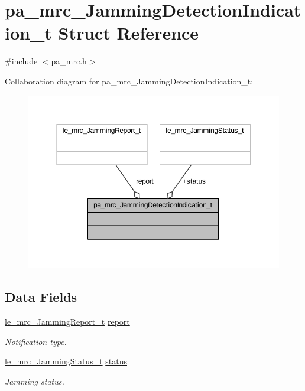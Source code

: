 \hypertarget{structpa__mrc___jamming_detection_indication__t}{}\section{pa\+\_\+mrc\+\_\+\+Jamming\+Detection\+Indication\+\_\+t Struct Reference}
\label{structpa__mrc___jamming_detection_indication__t}


{\ttfamily \#include $<$pa\+\_\+mrc.\+h$>$}



Collaboration diagram for pa\+\_\+mrc\+\_\+\+Jamming\+Detection\+Indication\+\_\+t\+:
\nopagebreak
\begin{figure}[H]
\begin{center}
\leavevmode
\includegraphics[width=350pt]{structpa__mrc___jamming_detection_indication__t__coll__graph}
\end{center}
\end{figure}
\subsection*{Data Fields}
\begin{DoxyCompactItemize}
\item 
\hyperlink{le__mrc__interface_8h_a06440780b5eeaeed66051e5c81ff20df}{le\+\_\+mrc\+\_\+\+Jamming\+Report\+\_\+t} \hyperlink{structpa__mrc___jamming_detection_indication__t_ac87a177533e06cf17ca4bcb309e784a2}{report}
\begin{DoxyCompactList}\small\item\em Notification type. \end{DoxyCompactList}\item 
\hyperlink{le__mrc__interface_8h_ac55bd8f71baee81d0021cc48f8ca0e09}{le\+\_\+mrc\+\_\+\+Jamming\+Status\+\_\+t} \hyperlink{structpa__mrc___jamming_detection_indication__t_a34bc416bc9c968faf5d2523e3f446753}{status}
\begin{DoxyCompactList}\small\item\em Jamming status. \end{DoxyCompactList}\end{DoxyCompactItemize}



